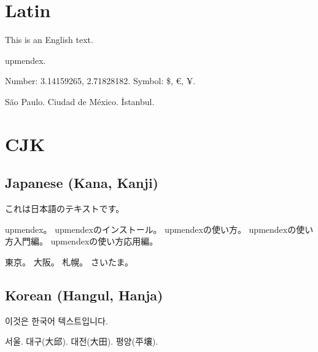 \documentclass[a4paper]{article}
\begin{document}
\thispagestyle{empty}
\section{Latin}
This is an English text.

upmendex.

Number: 3.14159265, 2.71828182.
Symbol: \$\index{\$}, €, ¥.

São Paulo.
Ciudad de México.
İstanbul.

\section{CJK}
\subsection{Japanese (Kana, Kanji)}
\begin{japanese}
これは日本語のテキストです。

upmendex。
upmendexのインストール。
upmendexの使い方。
upmendexの使い方入門編。
upmendexの使い方応用編。

東京。
大阪。
札幌。
さいたま。
\end{japanese}

\subsection{Korean (Hangul, Hanja)}
\begin{korean}
이것은 한국어 텍스트입니다.

서울.
대구(大邱).
대전(大田).
평양(平壤).
\end{korean}
\end{document}
